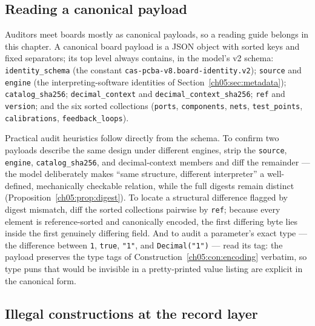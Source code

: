 \subsection{Reading a canonical payload}\label{ch05:sec:reading}

Auditors meet boards mostly as canonical payloads, so a reading guide
belongs in this chapter. A canonical board payload is a JSON object
with sorted keys and fixed separators; its top level always contains,
in the model's v2 schema: \texttt{identity\_schema} (the constant
\texttt{cas-pcba-v8.board-identity.v2}); \texttt{source} and
\texttt{engine} (the interpreting-software identities of
Section~\ref{ch05:sec:metadata}); \texttt{catalog\_sha256};
\texttt{decimal\_context} and \texttt{decimal\_context\_sha256};
\texttt{ref} and \texttt{version}; and the six sorted collections
(\texttt{ports}, \texttt{components}, \texttt{nets},
\texttt{test\_points}, \texttt{calibrations},
\texttt{feedback\_loops}).

Practical audit heuristics follow directly from the schema. To confirm
two payloads describe the same design under different engines, strip
the \texttt{source}, \texttt{engine}, \texttt{catalog\_sha256}, and
decimal-context members and diff the remainder --- the model
deliberately makes ``same structure, different interpreter'' a
well-defined, mechanically checkable relation, while the full digests
remain distinct (Proposition~\ref{ch05:prop:digest}). To locate a
structural difference flagged by digest mismatch, diff the sorted
collections pairwise by \texttt{ref}; because every element is
reference-sorted and canonically encoded, the first differing byte
lies inside the first genuinely differing field. And to audit a
parameter's exact type --- the difference between \texttt{1},
\texttt{true}, \texttt{"1"}, and \texttt{Decimal("1")} --- read its
tag: the payload preserves the type tags of
Construction~\ref{ch05:con:encoding} verbatim, so type puns that would
be invisible in a pretty-printed value listing are explicit in the
canonical form.

\subsection{Illegal constructions at the record layer}
\label{ch05:sec:illegalrecord}

